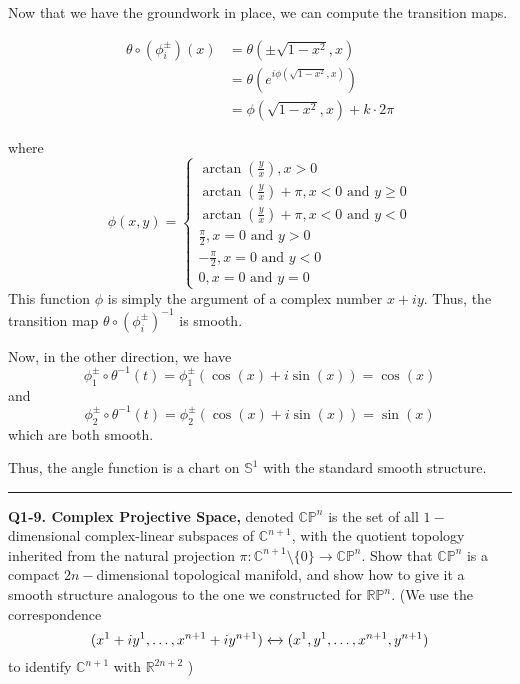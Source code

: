\documentclass{article}
\newcommand{\R}{\mathbb{R}}
\newcommand{\C}{\mathbb{C}}
\begin{document}
\vskip 0.25cm
Now that we have the groundwork in place, we can compute the transition maps.

\begin{align*}
  \theta \circ (\phi_i^{\pm})(x) &= \theta\left( \pm \sqrt{1 - x^2}, x \right) \\
  &= \theta \left( e^{i \phi(\sqrt{1 - x^2}, x)} \right) \\
  &= \phi(\sqrt{1 - x^2}, x) + k \cdot 2\pi
\end{align*}

where 
\[ \phi(x, y) = \begin{cases}
  \arctan(\frac{y}{x}), x > 0 \\
  \arctan(\frac{y}{x}) + \pi, x < 0 \text{ and } y \geq 0 \\
  \arctan(\frac{y}{x}) + \pi, x < 0 \text{ and } y < 0 \\
  \frac{\pi}{2}, x = 0 \text{ and } y > 0 \\
  -\frac{\pi}{2}, x = 0 \text{ and } y < 0 \\
  0, x = 0 \text{ and } y = 0 
\end{cases} \]
This function $\phi$ is simply the argument of a complex number $x + iy$. Thus, the transition map $\theta \circ (\phi_i^{\pm})^{-1}$ is smooth.

\vskip 0.25cm
Now, in the other direction, we have 
\[ \phi_1^{\pm} \circ \theta^{-1}(t) = \phi_1^{\pm} (\cos(x) + i\sin(x)) = \cos(x) \]
and 
\[ \phi_2^{\pm} \circ \theta^{-1}(t) = \phi_2^{\pm} (\cos(x) + i\sin(x)) = \sin(x) \]
which are both smooth.

\vskip 0.25cm
Thus, the angle function is a chart on $\mathbb{S}^1$ with the standard smooth structure.

\vskip 0.5cm
\hrule 
\vskip 0.5cm

\textbf{Q1-9. Complex Projective Space, } denoted $\mathbb{CP}^{n}$ is the set of all $1-$ dimensional complex-linear subspaces of $\C^{n+1}$, with the quotient topology inherited from the natural projection $\pi : \C^{n+1} \setminus \{ 0 \} \rightarrow \mathbb{CP}^{n}$. Show that $\mathbb{CP}^{n}$ is a compact $2n-$dimensional topological manifold, and show how to give it a smooth structure analogous to the one we constructed for $\mathbb{RP}^n$. (We use the correspondence 
\[ (x^1 + iy^1, \dots, x^{n+1} + iy^{n+1}) \xleftrightarrow{} (x^1, y^1, \dots, x^{n+1}, y^{n+1}) \]
to identify $\mathbb{C}^{n+1}$ with $\R^{2n+2}$
)
\end{document}
